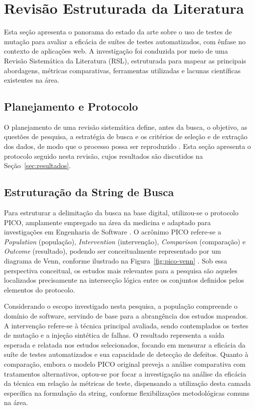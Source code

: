 \chapter{Revisão Estruturada da Literatura}
\label{cap:revisao-literatura}

Esta seção apresenta o panorama do estado da arte sobre o uso de testes de mutação para avaliar a eficácia de suítes de testes automatizados, com ênfase no contexto de aplicações web. A investigação foi conduzida por meio de uma Revisão Sistemática da Literatura (RSL), estruturada para mapear as principais abordagens, métricas comparativas, ferramentas utilizadas e lacunas científicas existentes na área.

\section{Planejamento e Protocolo}
\label{sec:planejamento-protocolo}

O planejamento de uma revisão sistemática define, antes da busca, o objetivo, as questões de pesquisa, a estratégia de busca e os critérios de seleção e de extração dos dados, de modo que o processo possa ser reproduzido \cite{kitchenham2007}. Esta seção apresenta o protocolo seguido nesta revisão, cujos resultados são discutidos na Seção~\ref{sec:resultados}.

\section{Estruturação da String de Busca}
\label{subsec:string-busca}

Para estruturar a delimitação da busca na base digital, utilizou-se o protocolo PICO, amplamente empregado na área da medicina e adaptado para investigações em Engenharia de Software \cite{kitchenham2007}. O acrônimo PICO refere-se a \textit{Population} (população), \textit{Intervention} (intervenção), \textit{Comparison} (comparação) e \textit{Outcome} (resultado), podendo ser conceitualmente representado por um diagrama de Venn, conforme ilustrado na Figura~\ref{fig:pico-venn} \cite{pai2004}. Sob essa perspectiva conceitual, os estudos mais relevantes para a pesquisa são aqueles localizados precisamente na intersecção lógica entre os conjuntos definidos pelos elementos do protocolo.

Considerando o escopo investigado nesta pesquisa, a população compreende o domínio de software, servindo de base para a abrangência dos estudos mapeados. A intervenção refere-se à técnica principal avaliada, sendo contemplados os testes de mutação e a injeção sintética de falhas. O resultado representa a saída esperada e relatada nos estudos selecionados, focando em mensurar a eficácia da suíte de testes automatizados e sua capacidade de detecção de defeitos. Quanto à comparação, embora o modelo PICO original preveja a análise comparativa com tratamentos alternativos, optou-se por focar a investigação na análise da eficácia da técnica em relação às métricas de teste, dispensando a utilização desta camada específica na formulação da string, conforme flexibilizações metodológicas comuns na área.

